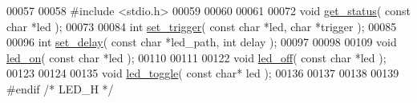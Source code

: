 \begin{DoxyCode}
00057 
00058 \textcolor{preprocessor}{#include <stdio.h>}
00059 
00060 
00061 
00072 \textcolor{keywordtype}{void} \hyperlink{led_8h_a795573f62d12f2ae16e7d8796ea148d4}{get\_status}( \textcolor{keyword}{const} \textcolor{keywordtype}{char} *led );
00073 
00084 \textcolor{keywordtype}{int} \hyperlink{led_8h_a9096dac081e5764a6418ff21aca0a7fe}{set\_trigger}( \textcolor{keyword}{const} \textcolor{keywordtype}{char} *led, \textcolor{keywordtype}{char} *trigger );
00085 
00096 \textcolor{keywordtype}{int} \hyperlink{led_8h_a1f6956111a94edb6167334dc8256100b}{set\_delay}( \textcolor{keyword}{const} \textcolor{keywordtype}{char} *led\_path, \textcolor{keywordtype}{int} delay );
00097 
00098 
00109 \textcolor{keywordtype}{void} \hyperlink{led_8h_ad0da1fddea24f56c3c54d71c35162a05}{led\_on}( \textcolor{keyword}{const} \textcolor{keywordtype}{char} *led );
00110 
00111 
00122 \textcolor{keywordtype}{void} \hyperlink{led_8h_aa7aa1173f21e957493cbe566e5066735}{led\_off}( \textcolor{keyword}{const} \textcolor{keywordtype}{char} *led );
00123 
00124 
00135 \textcolor{keywordtype}{void} \hyperlink{led_8h_ad5a256395c8cd67d2a9f9ff1abfd6d2a}{led\_toggle}( \textcolor{keyword}{const} \textcolor{keywordtype}{char}* led );
00136 
00137 
00138 
00139 \textcolor{preprocessor}{#endif   }\textcolor{comment}{/* LED\_H */}\textcolor{preprocessor}{}
\end{DoxyCode}
